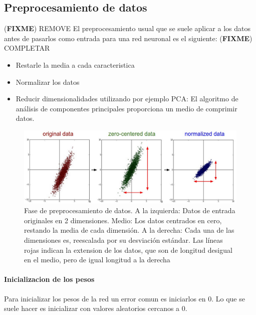 \documentclass[a4paper,11pt,spanish]{book}
\newcommand*{\FIXME}[1]{{(\textbf{FIXME}) {#1}}}
\begin{document}
    \subsection {Preprocesamiento de datos}\FIXME{REMOVE}
      El preprocesamiento usual que se suele aplicar a los datos antes de pasarlos como entrada para una red neuronal es el siguiente:
      \FIXME{COMPLETAR}
      \begin{itemize}
       \item Restarle la media a cada caracteristica
       \item Normalizar los datos
       \item Reducir dimensionalidades utilizando por ejemplo PCA: El algoritmo de análisis de componentes principales proporciona un medio de comprimir datos.
      \end{itemize}
      \begin{figure}[H]
	\includegraphics[scale=0.5]{./img/stanford_prepro.jpeg}
	\caption{Fase de preprocesamiento de datos. A la izquierda: Datos de entrada originales en 2 dimensiones. Medio: Los datos centrados en cero, restando la media de cada dimensión.
	  A la derecha: Cada una de las dimensiones es, reescalada por su desviación estándar. Las líneas rojas indican la extension de los datos, que son de longitud desigual en el
	  medio, pero de igual longitud a la derecha}
	\label{fig:preproc}
      \end{figure}

    \paragraph {Inicializacion de los pesos}
      Para inicializar los pesos de la red un error comun es iniciarlos en 0. Lo que se suele hacer es inicializar con valores aleatorios cercanos a 0.
\end{document}
